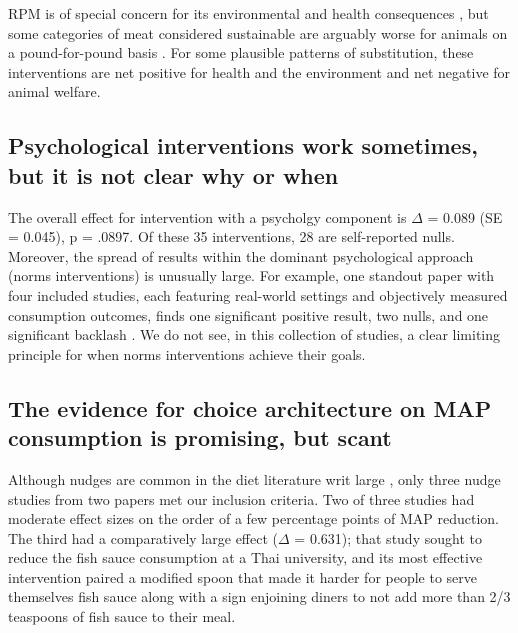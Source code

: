 \documentclass[sn-nature,pdflatex]{sn-jnl}
\begin{document}
RPM is of special concern for its environmental and health consequences
\citep{grummon2023}, but some categories of meat considered sustainable
are arguably worse for animals on a pound-for-pound basis
\citep{mathur2022ethical}. For some plausible patterns of substitution,
these interventions are net positive for health and the environment and
net negative for animal welfare.

\subsection{Psychological interventions work sometimes, but it is not
clear why or when}\label{sec2.4}

The overall effect for intervention with a psycholgy component is
\(\Delta\) = 0.089 (SE = 0.045), p = .0897. Of these 35 interventions,
28 are self-reported nulls. Moreover, the spread of results within the
dominant psychological approach (norms interventions) is unusually
large. For example, one standout paper with four included studies, each
featuring real-world settings and objectively measured consumption
outcomes, finds one significant positive result, two nulls, and one
significant backlash \citep{sparkman2020}. We do not see, in this
collection of studies, a clear limiting principle for when norms
interventions achieve their goals.

\begin{comment} say something about dannenberg 2024 or the 2024 meta-analysis that finds vey little?
\end{comment}

\subsection{The evidence for choice architecture on MAP consumption is
promising, but scant}\label{sec2.5}

Although nudges are common in the diet literature writ large
\citep{olafsson2024, cadario2020, szaszi2018}, only three nudge studies
from two papers \citep{kanchanachitra2020, andersson2021} met our
inclusion criteria. Two of three studies had moderate effect sizes on
the order of a few percentage points of MAP reduction. The third had a
comparatively large effect (\(\Delta\) = 0.631); that study sought to
reduce the fish sauce consumption at a Thai university, and its most
effective intervention paired a modified spoon that made it harder for
people to serve themselves fish sauce along with a sign enjoining diners
to not add more than 2/3 teaspoons of fish sauce to their meal.
\end{document}
